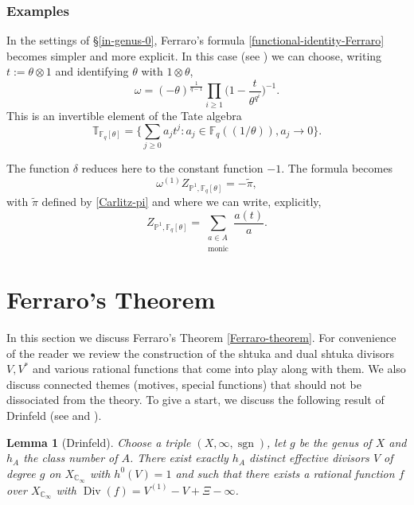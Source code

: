 \documentclass[11pt]{amsart}
\numberwithin{equation}{section}
\newcommand{\Div}{\operatorname{Div}}
\newcommand{\FF}{\mathbb{F}}
\newcommand{\CC}{\mathbb{C}}
\newcommand{\PP}{\mathbb{P}}
\newcommand{\TT}{\mathbb{T}}
\newcommand{\sgn}{\operatorname{sgn}}
\newtheorem{Lemma}[Theorem]{Lemma}
\begin{document}
\subsubsection{Examples}

In the settings of \S \ref{in-genus-0}, Ferraro's formula \eqref{functional-identity-Ferraro} becomes simpler and more explicit. 
In this case (see \cite{PEL}) we can choose, writing $t:=\theta\otimes1$ and identifying $\theta$ with $1\otimes\theta$, $$\omega=(-\theta)^{\frac{1}{q-1}}\prod_{i\geq1}\Big(1-\frac{t}{\theta^{q^i}}\Big)^{-1}.$$ This is an invertible element of the Tate algebra
$$\TT_{\FF_q[\theta]}=\Big\{\sum_{j\geq0}a_jt^j:a_j\in \FF_q((1/\theta)),a_j\rightarrow0\Big\}.$$

The function $\delta$ reduces here to the constant function $-1$. The formula becomes
$$\omega^{(1)}Z_{\PP^1,\FF_q[\theta]}=-\widetilde{\pi},$$ with $\widetilde{\pi}$ defined by \eqref{Carlitz-pi} and 
where we can write, explicitly,
$$Z_{\PP^1,\FF_q[\theta]}=\sum_{\begin{smallmatrix} a\in A\\ \text{monic}\end{smallmatrix}}\frac{a(t)}{a}.$$

\section{Ferraro's Theorem}\label{Drinfeld-shtuka-divisors}

In this section we discuss Ferraro's Theorem \ref{Ferraro-theorem}. For convenience of the reader we review the construction of the shtuka and dual shtuka divisors $V,V^*$ and various rational functions that come into play along with them. We also discuss connected themes (motives, special functions) that should not be dissociated from the theory. To give a start, we discuss the following result of Drinfeld (see \cite{AND2,THA-1,FER1} and \cite[\S 4.3 and more precisely Proposition 4.25]{FER1}).

\begin{Lemma}[Drinfeld]\label{drinfeld-lemma}
Choose a triple $(X,\infty,\sgn)$, let $g$ be the genus of $X$ and $h_A$ the class number of $A$. There exist exactly $h_A$ distinct effective divisors $V$ of degree $g$ on 
$X_{\CC_\infty}$ with $h^0(V)=1$ and such that there exists a rational function $f$ over $X_{\CC_\infty}$ with $\Div(f)=V^{(1)}-V+\Xi-\infty$.
\end{Lemma}
\end{document}
